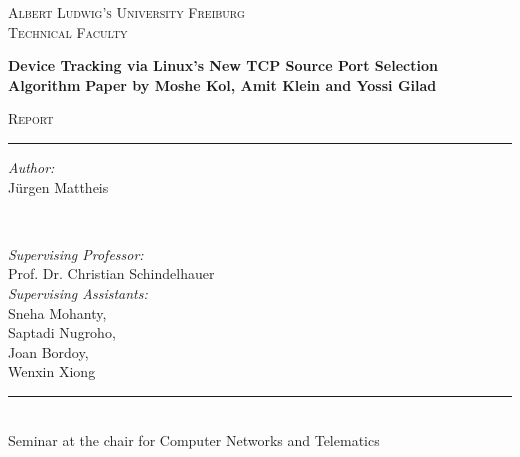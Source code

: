 \begin{titlepage}
  \vspace{1cm}
  \center
  \textsc{\LARGE Albert Ludwig's University Freiburg}\\[0.5cm]
  \textsc{\Large Technical Faculty}\\[2.0cm]

  \vspace{1cm}

	\begin{titlebox}{\center \huge \bfseries Device Tracking via Linux’s New TCP Source Port Selection Algorithm}
		\centering
		\bfseries \Large Paper by Moshe Kol, Amit Klein and Yossi Gilad\cite{kol2022devicetrackinglinuxsnew}
	\end{titlebox}

  \textsc{\large Report}\\
  \rule{\linewidth}{0.1mm}

  \vspace{3cm}

  \begin{minipage}[t]{0.45\textwidth}
    \begin{flushleft} \large
      \emph{Author:}\\
      Jürgen Mattheis
    \end{flushleft}
  \end{minipage}
  ~
  \begin{minipage}[t]{0.45\textwidth}
    \begin{flushright} \large
      \emph{Supervising Professor:}\\
      Prof. Dr. Christian Schindelhauer\\[0.64cm]
      \emph{Supervising Assistants:}\\
      Sneha Mohanty,\\
      Saptadi Nugroho,\\
      Joan Bordoy,\\
      Wenxin Xiong
    \end{flushright}
  \end{minipage}

  \vspace{7cm}
  \rule{12cm}{0.1mm}\\[0.25cm]
  \large{Seminar at the chair for Computer Networks and Telematics}
\end{titlepage}
